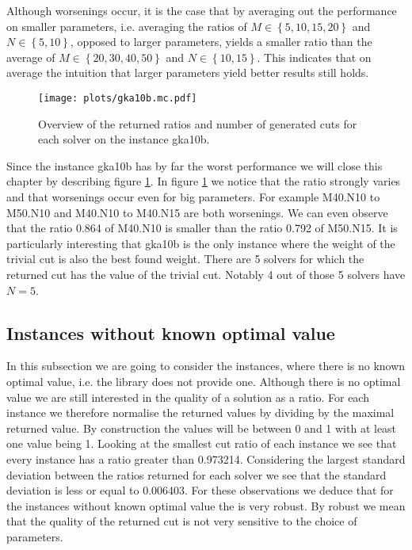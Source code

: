 \documentclass[12pt,a4paper]{article}
\theoremstyle{mythm}
\begin{document}

Although worsenings occur, it is the case that by averaging out the performance on smaller parameters, i.e. averaging the ratios of $ M \in \left\{ 5,10,15,20
\right\}  $ and $ N \in \left\{ 5,10 \right\} $, opposed to larger parameters, yields a smaller ratio than the average of $ M \in \left\{ 20,30,40,50 \right\}  $ and $ N \in \left\{ 10,15 \right\}  $.
This indicates that on average the intuition that larger parameters yield better results still holds.

\begin{figure}
\texttt{[image: plots/gka10b.mc.pdf]}
\caption{Overview of the returned ratios and number of generated cuts for each solver on the instance gka10b.}
\label{plot:gka10b} 
\end{figure} 
Since the instance gka10b has by far the worst performance we will close this chapter by describing figure \ref{plot:gka10b}.
In figure \ref{plot:gka10b}  we notice that the ratio strongly varies and that worsenings occur even for big parameters.
For example M40.N10 to M50.N10 and M40.N10 to M40.N15 are both worsenings.
We can even observe that the ratio 0.864 of M40.N10 is smaller than the ratio 0.792 of M50.N15.
It is particularly interesting that gka10b is the only instance where the weight of the trivial cut is also the best found weight. 
There are 5 solvers for which the returned cut has the value of the trivial cut.
Notably 4 out of those 5 solvers have $ N = 5 $.




\subsection{Instances without known optimal value} 
\label{ssec:UnknownOptVal} 
In this subsection we are going to consider the instances, where there is no known optimal value, i.e. the library \cite{MallachLibrary} does not provide one.
Although there is no optimal value we are still interested in the quality of a solution as a ratio.
For each instance we therefore normalise the returned values by dividing by the maximal returned value.
By construction the values will be between 0 and 1 with at least one value being 1.
Looking at the smallest cut ratio of each instance we see that every instance has a ratio greater than 0.973214.
Considering the largest standard deviation between the ratios returned for each solver we see that the standard deviation is less or equal to 0.006403. 
For these observations we deduce that for the instances without known optimal value the \BH is very robust. 
By robust we mean that the quality of the returned cut is not very sensitive to the choice of parameters.
\end{document}
